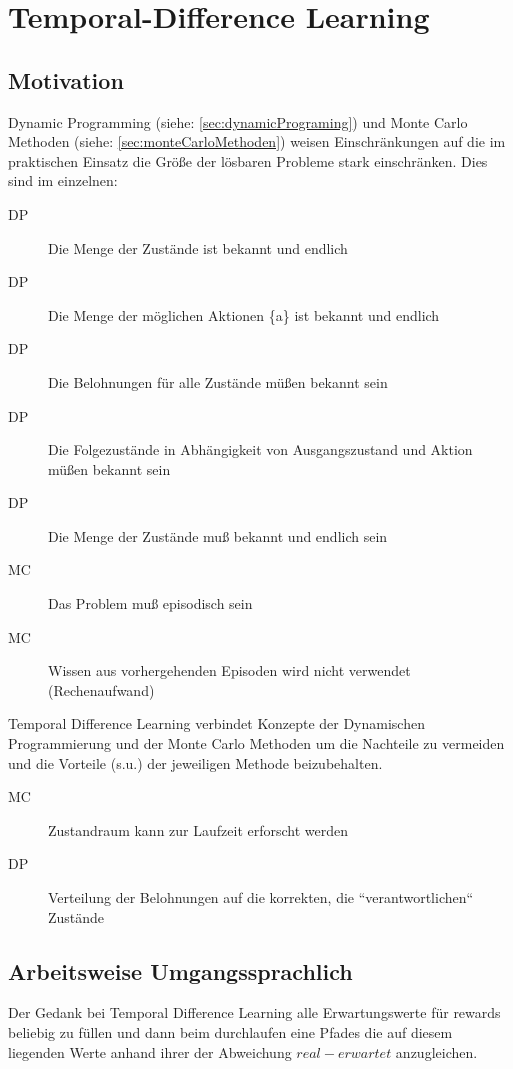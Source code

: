 \documentclass[10pt]{scrartcl}
\begin{document}
\section{Temporal-Difference Learning}
	\subsection{Motivation}
	Dynamic Programming (siehe: \ref{sec:dynamicPrograming}) und Monte Carlo Methoden (siehe: \ref{sec:monteCarloMethoden}) weisen Einschränkungen auf die im praktischen Einsatz die Größe der lösbaren Probleme stark einschränken. Dies sind im einzelnen:
	\begin{description}
		\item[DP]{Die Menge der Zustände ist bekannt und endlich}
		\item[DP]{Die Menge der möglichen Aktionen \{a\} ist bekannt und endlich}
		\item[DP]{Die Belohnungen für alle Zustände müßen bekannt sein}
		\item[DP]{Die Folgezustände in Abhängigkeit von Ausgangszustand und Aktion müßen bekannt sein}
 		\item[DP]{Die Menge der Zustände muß bekannt und endlich sein}
		\item[MC]{Das Problem muß episodisch sein}
		\item[MC]{Wissen aus vorhergehenden Episoden wird nicht verwendet (Rechenaufwand)}
	\end{description}
	
	Temporal Difference Learning verbindet Konzepte der Dynamischen Programmierung und der Monte Carlo Methoden um die Nachteile zu vermeiden und die Vorteile (s.u.) der jeweiligen Methode beizubehalten.
	
	\begin{description}
		\item[MC] Zustandraum kann zur Laufzeit erforscht werden
		\item[DP] Verteilung der Belohnungen auf die korrekten, die ``verantwortlichen`` Zustände
	\end{description}


	\subsection{Arbeitsweise Umgangssprachlich}
	Der Gedank bei Temporal Difference Learning alle Erwartungswerte für rewards beliebig zu füllen und dann beim durchlaufen eine Pfades die auf diesem liegenden Werte anhand ihrer der Abweichung $real - erwartet$ anzugleichen.
\end{document}
